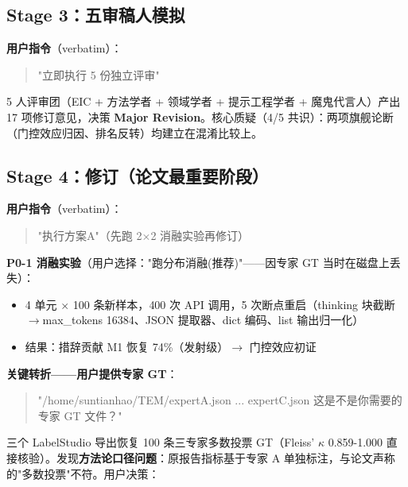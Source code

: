 \documentclass[11pt]{article}
\begin{document}
\subsection{Stage 3{\cjkfont ：五审稿人模拟}}
\textbf{{\cjkfont 用户指令}}{\cjkfont （}verbatim{\cjkfont ）：}

\begin{quote}"{\cjkfont 立即执行} 5 {\cjkfont 份独立评审}"\end{quote}

5 {\cjkfont 人评审团（}EIC + {\cjkfont 方法学者} + {\cjkfont 领域学者} + {\cjkfont 提示工程学者} + {\cjkfont 魔鬼代言人）产出} 17 {\cjkfont 项修订意见，决策} \textbf{Major Revision}{\cjkfont 。核心质疑（}4/5 {\cjkfont 共识）：两项旗舰论断（门控效应归因、排名反转）均建立在混淆比较上。}

\subsection{Stage 4{\cjkfont ：修订（论文最重要阶段）}}
\textbf{{\cjkfont 用户指令}}{\cjkfont （}verbatim{\cjkfont ）：}

\begin{quote}"{\cjkfont 执行方案}A"{\cjkfont （先跑} 2$\times$2 {\cjkfont 消融实验再修订）}\end{quote}

\textbf{P0-1 {\cjkfont 消融实验}}{\cjkfont （用户选择：}"{\cjkfont 跑分布消融}({\cjkfont 推荐})"------{\cjkfont 因专家} GT {\cjkfont 当时在磁盘上丢失）：}

\begin{itemize}
\item 4 {\cjkfont 单元} $\times$ 100 {\cjkfont 条新样本，}400 {\cjkfont 次} API {\cjkfont 调用，}5 {\cjkfont 次断点重启（}thinking {\cjkfont 块截断}$\rightarrow$max\_tokens 16384{\cjkfont 、}JSON {\cjkfont 提取器、}dict {\cjkfont 编码、}list {\cjkfont 输出归一化）}
\item {\cjkfont 结果：措辞贡献} M1 {\cjkfont 恢复} 74\%{\cjkfont （发射级）}$\rightarrow$ {\cjkfont 门控效应初证}
\end{itemize}
\textbf{{\cjkfont 关键转折}------{\cjkfont 用户提供专家} GT}{\cjkfont ：}

\begin{quote}"/home/suntianhao/TEM/expertA.json ... expertC.json {\cjkfont 这是不是你需要的专家} GT {\cjkfont 文件？}"\end{quote}

{\cjkfont 三个} LabelStudio {\cjkfont 导出恢复} 100 {\cjkfont 条三专家多数投票} GT{\cjkfont （}Fleiss' $\kappa$ 0.859-1.000 {\cjkfont 直接核验）。发现}\textbf{{\cjkfont 方法论口径问题}}{\cjkfont ：原报告指标基于专家} A {\cjkfont 单独标注，与论文声称的}"{\cjkfont 多数投票}"{\cjkfont 不符。用户决策：}
\end{document}
